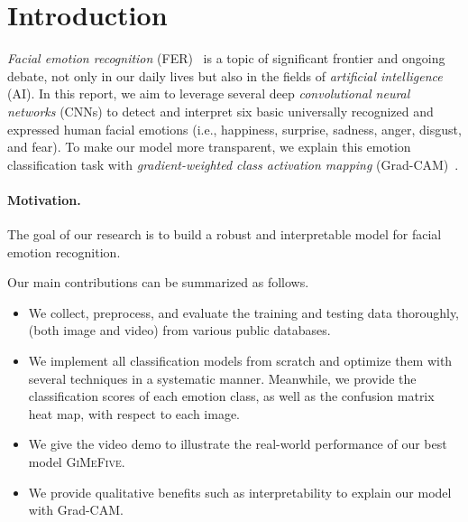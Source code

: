 \section{Introduction}
\label{sec:intro}

\textit{Facial emotion recognition} (FER)~\cite{Ko18,JainSS19,YinTLS019,Malik0R21} is a topic of significant frontier and ongoing debate, 
not only in our daily lives but also in the fields of \textit{artificial intelligence} (AI).
In this report, we aim to leverage several deep 
\textit{convolutional neural networks} (CNNs) to detect and interpret six basic universally recognized and expressed human facial emotions 
(i.e., happiness, surprise, sadness, anger, disgust, and fear). 
To make our model more transparent, 
we explain this emotion classification task with \textit{gradient-weighted class activation mapping} 
(Grad-CAM)~\cite{SelvarajuCDVPB17}. 

\paragraph{Motivation.} %
The goal of our research is to build a robust and interpretable model for facial emotion recognition.

Our main contributions can be summarized as follows.
\begin{itemize}
  \item We collect, preprocess, and evaluate the training and testing data thoroughly, 
  (both image and video) from various public databases. 
  \item We implement all classification models from scratch and optimize them with several techniques in a systematic manner. 
  Meanwhile, we provide the classification scores of each emotion class, 
  as well as the confusion matrix heat map, with respect to each image. 
  \item We give the video demo to illustrate the real-world performance of our best model \textsc{GiMeFive}. 
  \item We provide qualitative benefits such as interpretability to explain our model with Grad-CAM. %
\end{itemize}

